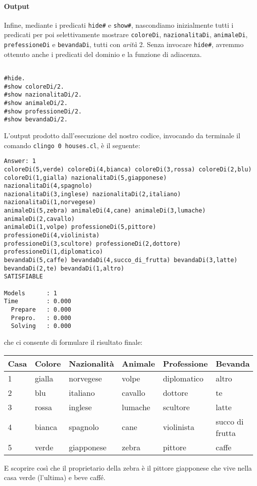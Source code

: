 \paragraph{Output}
Infine, mediante i predicati \texttt{hide\#} e \texttt{show\#}, nascondiamo inizialmente tutti i predicati per poi selettivamente mostrare \texttt{coloreDi}, \texttt{nazionalitaDi}, \texttt{animaleDi}, \texttt{prefessioneDi} e \texttt{bevandaDi}, tutti con \emph{arità} 2. Senza invocare \texttt{hide\#}, avremmo ottenuto anche i predicati del dominio e la funzione di adiacenza.
\begin{lstlisting}[frame=tb]
%% Output

#hide.
#show coloreDi/2.
#show nazionalitaDi/2.
#show animaleDi/2.
#show professioneDi/2.
#show bevandaDi/2.
\end{lstlisting}
L'output prodotto dall'esecuzione del nostro codice, invocando da terminale il comando \texttt{clingo 0 houses.cl}, è il seguente:
\footnotesize{\begin{verbatim}
Answer: 1
coloreDi(5,verde) coloreDi(4,bianca) coloreDi(3,rossa) coloreDi(2,blu)
coloreDi(1,gialla) nazionalitaDi(5,giapponese) nazionalitaDi(4,spagnolo)
nazionalitaDi(3,inglese) nazionalitaDi(2,italiano) nazionalitaDi(1,norvegese)
animaleDi(5,zebra) animaleDi(4,cane) animaleDi(3,lumache) animaleDi(2,cavallo)
animaleDi(1,volpe) professioneDi(5,pittore) professioneDi(4,violinista)
professioneDi(3,scultore) professioneDi(2,dottore) professioneDi(1,diplomatico)
bevandaDi(5,caffe) bevandaDi(4,succo_di_frutta) bevandaDi(3,latte)
bevandaDi(2,te) bevandaDi(1,altro) 
SATISFIABLE

Models      : 1    
Time        : 0.000
  Prepare   : 0.000
  Prepro.   : 0.000
  Solving   : 0.000
\end{verbatim}}
che ci consente di formulare il risultato finale:
\begin{center}
    \begin{tabular}{| l | l | l | l | l | l |} \hline
    \textbf{Casa} & \textbf{Colore} & \textbf{Nazionalità} & \textbf{Animale} & \textbf{Professione} & \textbf{Bevanda}\\ \hline
    1       & gialla    & norvegese     & volpe     & diplomatico   & altro             \\ \hline
    2       & blu       & italiano      & cavallo   & dottore       & te                \\ \hline
    3       & rossa     & inglese       & lumache   & scultore      & latte             \\ \hline
    4       & bianca    & spagnolo      & cane      & violinista    & succo di frutta   \\ \hline
    5       & verde     & giapponese    & zebra     & pittore       & caffe             \\ \hline
    \end{tabular}
\end{center}
E scoprire così che il proprietario della zebra è il pittore giapponese che vive nella casa verde (l'ultima) e beve caffé.
